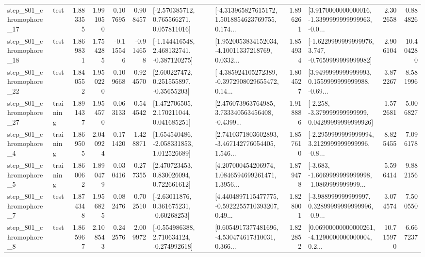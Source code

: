 \begin{tabular}{llrrrrllrlrr}
  step\_801\_chromophore\_17 &      test &      1.883355 &    1.991050 &      0.107695 &  0.908457 &    [-2.570385712, 0.765566271, 0.057811016] &  [-4.313965827615172, 1.5018854623769755, 0.174... &       1.896261 &  [3.9170000000000016, -1.3399999999999963, -0.0... &            2.302658 &          0.884826 \\
  step\_801\_chromophore\_18 &      test &      1.869831 &    1.754285 &     -0.115546 & -0.914658 &   [-1.144416548, 2.468132741, -0.387120275] &  [1.9520053834152034, -4.10011337218769, 0.0332... &       1.854934 &  [-1.6229999999999976, 3.747, -0.7659999999999982] &            2.906104 &         10.404280 \\
  step\_801\_chromophore\_22 &      test &      1.840552 &    1.950220 &      0.109668 &  0.924570 &     [2.600227472, 0.251555897, -0.35655203] &  [-4.385924105272389, -0.3972908029655472, 0.14... &       1.804527 &  [3.9499999999999993, 0.1559999999999988, -0.69... &            3.872267 &          8.581996 \\
  step\_801\_chromophore\_27 &  training &      1.891437 &    1.954570 &      0.063133 &  0.544542 &     [1.472706505, 2.170211044, 0.041685251] &  [2.476073963764985, 3.733340563456408, -0.4399... &       1.918886 &  [-2.258, -3.379999999999999, 0.04299999999999926] &            1.572681 &          5.006827 \\
   step\_801\_chromophore\_4 &  training &      1.869505 &    2.040924 &      0.171420 &  1.428871 &    [1.654540486, -2.058331853, 1.012526689] &  [2.7410371803602893, -3.467142776054405, 1.546... &       1.857610 &  [-2.2959999999999994, 3.2129999999999996, -0.8... &            8.825455 &          7.096178 \\
   step\_801\_chromophore\_5 &  training &      1.860062 &    1.890479 &      0.030416 &  0.277355 &     [2.470723453, 0.830026094, 0.722661612] &  [4.207000454206974, 1.0846594699261471, 1.3956... &       1.879478 &  [-3.683, -1.6669999999999998, -1.0869999999999... &            5.596414 &          9.882156 \\
   step\_801\_chromophore\_7 &      test &      1.874348 &    1.956825 &      0.082476 &  0.702510 &     [-2.63011876, 0.361675231, -0.60268253] &  [4.4404897115477775, -0.5922255710393207, 0.49... &       1.828001 &  [-3.988999999999997, 0.32899999999999996, -0.9... &            3.074574 &          7.500550 \\
   step\_801\_chromophore\_8 &      test &      1.865967 &    2.108543 &      0.242576 &  2.009972 &   [-0.554986388, 2.710634124, -0.274992618] &  [0.6054917377481696, -4.530474617310031, 0.366... &       1.822852 &  [0.06900000000000261, -4.1290000000000004, 0.2... &           10.715970 &          6.667237 \\

\end{tabular}
